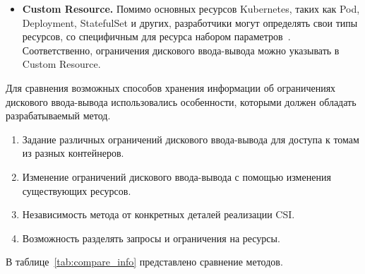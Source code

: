 \begin{itemize}
\item \textbf{Custom Resource.} Помимо основных ресурсов Kubernetes, таких как Pod, Deployment, StatefulSet и других, разработчики могут определять свои типы ресурсов, со специфичным для ресурса набором параметров~\cite{crd}. Соответственно, ограничения дискового ввода-вывода можно указывать в Custom Resource. 
\end{itemize}

Для сравнения возможных способов хранения информации об ограничениях дискового ввода-вывода использовались особенности, которыми должен обладать разрабатываемый метод.

\begin{enumerate}
	\item Задание различных ограничений дискового ввода-вывода для доступа к томам из разных контейнеров.
	\item Изменение ограничений дискового ввода-вывода с помощью изменения существующих ресурсов.
	\item Независимость метода от конкретных деталей реализации CSI.
	\item Возможность разделять запросы и ограничения на ресурсы.
\end{enumerate}

В таблице~\ref{tab:compare_info} представлено сравнение методов.


	


